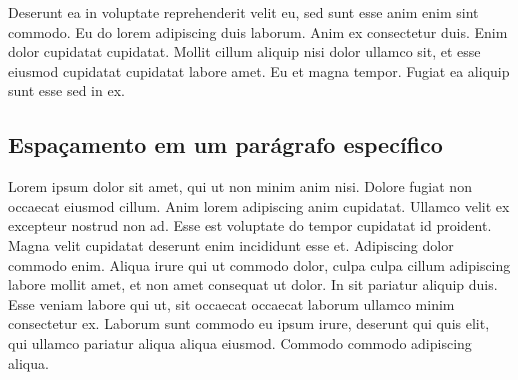 \documentclass{article}
\begin{document}
Deserunt ea in voluptate reprehenderit velit eu, sed sunt esse anim enim sint commodo.
Eu do lorem adipiscing duis laborum. Anim ex consectetur duis. Enim dolor cupidatat cupidatat.
Mollit cillum aliquip nisi dolor ullamco sit, et esse eiusmod cupidatat cupidatat labore amet. Eu et magna tempor.
Fugiat ea aliquip sunt esse sed in ex.

\begin{onehalfspace} %
    \section{Espaçamento em um parágrafo específico}

    Lorem ipsum dolor sit amet, qui ut non minim anim nisi. Dolore fugiat non occaecat eiusmod cillum.
    Anim lorem adipiscing anim cupidatat. Ullamco velit ex excepteur nostrud non ad. Esse est voluptate do tempor cupidatat id proident.
    Magna velit cupidatat deserunt enim incididunt esse et. Adipiscing dolor commodo enim.
    Aliqua irure qui ut commodo dolor, culpa culpa cillum adipiscing labore mollit amet, et non amet consequat ut dolor.
    In sit pariatur aliquip duis. Esse veniam labore qui ut, sit occaecat occaecat laborum ullamco minim consectetur ex.
    Laborum sunt commodo eu ipsum irure, deserunt qui quis elit, qui ullamco pariatur aliqua aliqua eiusmod. Commodo commodo adipiscing aliqua.
\end{onehalfspace}
\end{document}
